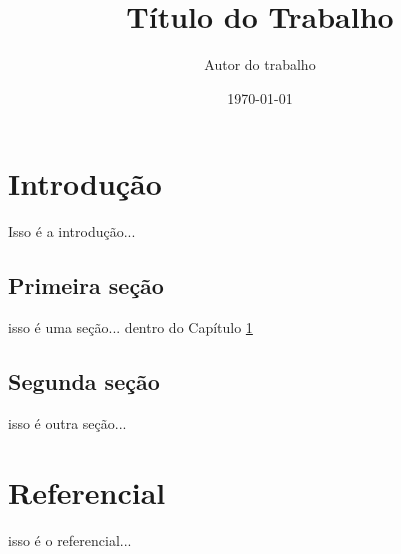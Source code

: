 \documentclass[a4paper,oneside,12pt]{book}
\title{Título do Trabalho}
\author{Autor do trabalho}
\date{\today}
\begin{document}
	\maketitle	%
	\tableofcontents    %
  \chapter{Introdução}\label{chap:intro}
  Isso é a introdução...
  \section{Primeira seção}\label{sec:pri}
  isso é uma seção... dentro do Capítulo \ref{chap:intro}
  \section{Segunda seção}\label{sec:seg}
   isso é outra seção...
  \chapter{Referencial}\label{sec:prisub}
  isso é o referencial...
\end{document}
